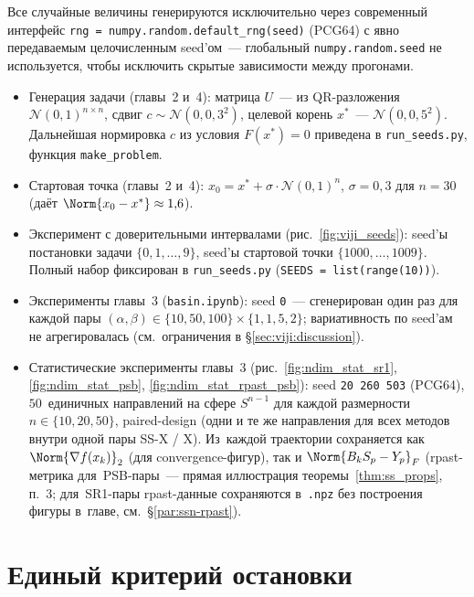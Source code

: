 Все случайные величины генерируются исключительно через современный
интерфейс \texttt{rng = numpy.random.default\_rng(seed)} (PCG64) с
явно передаваемым целочисленным seed'ом~--- глобальный
\texttt{numpy.random.seed} не используется, чтобы исключить скрытые
зависимости между прогонами.
\begin{itemize}\itemsep0pt
  \item Генерация задачи (главы~2 и~4):
        матрица $U$~--- из QR-разложения $\mathcal N(0,1)^{n\times n}$,
        сдвиг $c\sim\mathcal N(0,0{,}3^2)$, целевой корень $x^{*}$~---
        $\mathcal N(0,0{,}5^2)$. Дальнейшая нормировка $c$ из условия
        $F(x^{*})=0$ приведена в \texttt{run\_seeds.py}, функция
        \texttt{make\_problem}.
  \item Стартовая точка (главы~2 и~4): $x_0 = x^{*} + \sigma\cdot \mathcal N(0,1)^n$,
        $\sigma=0{,}3$ для $n=30$ (даёт $\Norm{x_0-x^{*}}\approx 1{,}6$).
  \item Эксперимент с доверительными интервалами (рис.~\ref{fig:viji_seeds}):
        seed'ы постановки задачи $\{0,1,\ldots,9\}$, seed'ы стартовой
        точки $\{1000,\ldots,1009\}$. Полный набор фиксирован в
        \texttt{run\_seeds.py} (\texttt{SEEDS = list(range(10))}).
  \item Эксперименты главы~3 (\texttt{basin.ipynb}): seed
        \texttt{0}~--- сгенерирован один раз для каждой пары
        $(\alpha,\beta)\in\{10,50,100\}\times\{1,1{,}5,2\}$;
        вариативность по seed'ам не агрегировалась
        (см.\ ограничения в \S\ref{sec:viji:discussion}).
  \item Статистические эксперименты главы~3
        (рис.~\ref{fig:ndim_stat_sr1}, \ref{fig:ndim_stat_psb},
        \ref{fig:ndim_stat_rpast_psb}):
        seed \texttt{20\,260\,503} (PCG64), $50$~единичных направлений
        на сфере $S^{n-1}$ для каждой размерности $n\in\{10,20,50\}$,
        paired-design (одни и те же направления для всех методов
        внутри одной пары SS-X / X). Из~каждой траектории сохраняется
        как $\Norm{\nabla f(x_k)}_2$ (для convergence-фигур), так и
        $\Norm{B_k S_p - Y_p}_F$ (rpast-метрика для~PSB-пары~--- прямая
        иллюстрация теоремы~\ref{thm:ss_props}, п.~3; для~SR1-пары
        rpast-данные сохраняются в~\texttt{.npz} без построения фигуры
        в~главе, см.~\S\ref{par:ssn-rpast}).
\end{itemize}

\section{Единый критерий остановки}

